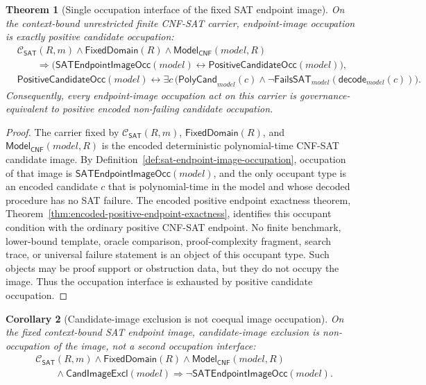\documentclass[11pt]{article}
\newtheorem{theorem}{Theorem}[section]
\newtheorem{corollary}[theorem]{Corollary}
\theoremstyle{definition}
\theoremstyle{remark}
\newcommand{\ClayCtx}{\mathcal{C}_{\mathsf{SAT}}(R,m)}
\newcommand{\FixedDom}{\mathsf{FixedDomain}}
\newcommand{\ModelOfCnf}{\mathsf{Model}_{\mathsf{CNF}}}
\newcommand{\PolyCand}{\mathsf{PolyCand}}
\newcommand{\FailsSAT}{\mathsf{FailsSAT}}
\newcommand{\Decode}{\mathsf{decode}}
\newcommand{\CandImageExcl}{\mathsf{CandImageExcl}}
\newcommand{\SATEndpointImageOcc}{\mathsf{SATEndpointImageOcc}}
\newcommand{\PositiveCandidateOcc}{\mathsf{PositiveCandidateOcc}}
\begin{document}
\begin{theorem}[Single occupation interface of the fixed SAT endpoint image]\label{thm:single-occupation-interface-sat}
On the context-bound unrestricted finite CNF-SAT carrier, endpoint-image occupation is exactly positive candidate occupation:
\[
\begin{aligned}
  &\ClayCtx\wedge\FixedDom(R)\wedge\ModelOfCnf(model,R)\\
  &\qquad\Rightarrow
  \bigl(\SATEndpointImageOcc(model)\leftrightarrow\PositiveCandidateOcc(model)\bigr),\\
  &\PositiveCandidateOcc(model)\leftrightarrow
  \exists c\,\bigl(\PolyCand_{model}(c)\wedge
  \neg\FailsSAT_{model}(\Decode_{model}(c))\bigr).
\end{aligned}
\]
Consequently, every endpoint-image occupation act on this carrier is governance-equivalent to positive encoded non-failing candidate occupation.
\end{theorem}

\begin{proof}
The carrier fixed by \(\ClayCtx\), \(\FixedDom(R)\), and \(\ModelOfCnf(model,R)\) is the encoded deterministic polynomial-time CNF-SAT candidate image. By Definition~\ref{def:sat-endpoint-image-occupation}, occupation of that image is \(\SATEndpointImageOcc(model)\), and the only occupant type is an encoded candidate \(c\) that is polynomial-time in the model and whose decoded procedure has no SAT failure. The encoded positive endpoint exactness theorem, Theorem~\ref{thm:encoded-positive-endpoint-exactness}, identifies this occupant condition with the ordinary positive CNF-SAT endpoint. No finite benchmark, lower-bound template, oracle comparison, proof-complexity fragment, search trace, or universal failure statement is an object of this occupant type. Such objects may be proof support or obstruction data, but they do not occupy the image. Thus the occupation interface is exhausted by positive candidate occupation.
\end{proof}

\begin{corollary}[Candidate-image exclusion is not coequal image occupation]\label{cor:candidate-image-exclusion-not-coequal-occupation}
On the fixed context-bound SAT endpoint image, candidate-image exclusion is non-occupation of the image, not a second occupation interface:
\[
\begin{aligned}
  &\ClayCtx\wedge\FixedDom(R)\wedge\ModelOfCnf(model,R)\\
  &\qquad\wedge\CandImageExcl(model)
  \Rightarrow \neg\SATEndpointImageOcc(model).
\end{aligned}
\]
\end{corollary}
\end{document}
